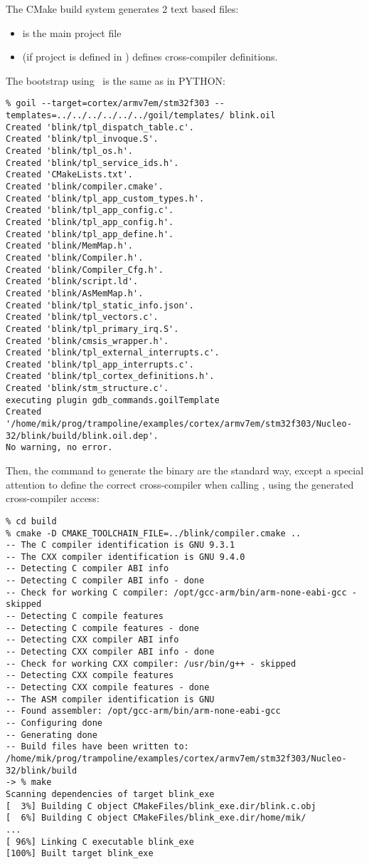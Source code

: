 The CMake build system generates 2 text based files:
\begin{itemize}
	\item {} is the main project file
	\item {} (if project is defined in ) defines cross-compiler definitions.
\end{itemize}

The bootstrap using \goil\ is the same as in PYTHON:
\begin{verbatim}
% goil --target=cortex/armv7em/stm32f303 --templates=../../../../../../goil/templates/ blink.oil
Created 'blink/tpl_dispatch_table.c'.
Created 'blink/tpl_invoque.S'.
Created 'blink/tpl_os.h'.
Created 'blink/tpl_service_ids.h'.
Created 'CMakeLists.txt'.
Created 'blink/compiler.cmake'.
Created 'blink/tpl_app_custom_types.h'.
Created 'blink/tpl_app_config.c'.
Created 'blink/tpl_app_config.h'.
Created 'blink/tpl_app_define.h'.
Created 'blink/MemMap.h'.
Created 'blink/Compiler.h'.
Created 'blink/Compiler_Cfg.h'.
Created 'blink/script.ld'.
Created 'blink/AsMemMap.h'.
Created 'blink/tpl_static_info.json'.
Created 'blink/tpl_vectors.c'.
Created 'blink/tpl_primary_irq.S'.
Created 'blink/cmsis_wrapper.h'.
Created 'blink/tpl_external_interrupts.c'.
Created 'blink/tpl_app_interrupts.c'.
Created 'blink/tpl_cortex_definitions.h'.
Created 'blink/stm_structure.c'.
executing plugin gdb_commands.goilTemplate
Created '/home/mik/prog/trampoline/examples/cortex/armv7em/stm32f303/Nucleo-32/blink/build/blink.oil.dep'.
No warning, no error.
\end{verbatim}

Then, the command to generate the binary are the standard way, except a special attention to define the correct cross-compiler when calling , using the generated cross-compiler access: 


\begin{verbatim}
% cd build    
% cmake -D CMAKE_TOOLCHAIN_FILE=../blink/compiler.cmake ..
-- The C compiler identification is GNU 9.3.1
-- The CXX compiler identification is GNU 9.4.0
-- Detecting C compiler ABI info
-- Detecting C compiler ABI info - done
-- Check for working C compiler: /opt/gcc-arm/bin/arm-none-eabi-gcc - skipped
-- Detecting C compile features
-- Detecting C compile features - done
-- Detecting CXX compiler ABI info
-- Detecting CXX compiler ABI info - done
-- Check for working CXX compiler: /usr/bin/g++ - skipped
-- Detecting CXX compile features
-- Detecting CXX compile features - done
-- The ASM compiler identification is GNU
-- Found assembler: /opt/gcc-arm/bin/arm-none-eabi-gcc
-- Configuring done
-- Generating done
-- Build files have been written to: /home/mik/prog/trampoline/examples/cortex/armv7em/stm32f303/Nucleo-32/blink/build
-> % make
Scanning dependencies of target blink_exe
[  3%] Building C object CMakeFiles/blink_exe.dir/blink.c.obj
[  6%] Building C object CMakeFiles/blink_exe.dir/home/mik/
...
[ 96%] Linking C executable blink_exe
[100%] Built target blink_exe
\end{verbatim}

